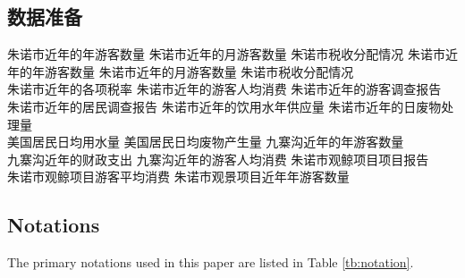 \documentclass[12pt]{article}  %
\begin{document}
\subsection{数据准备}
\begin{tabbing}
    朱诺市近年的年游客数量 \= 朱诺市近年的月游客数量 \= 朱诺市税收分配情况 \kill
    朱诺市近年的年游客数量 \> 朱诺市近年的月游客数量 \> 朱诺市税收分配情况 \\
    朱诺市近年的各项税率 \> 朱诺市近年的游客人均消费 \> 朱诺市近年的游客调查报告 \\
    朱诺市近年的居民调查报告 \> 朱诺市近年的饮用水年供应量 \> 朱诺市近年的日废物处理量 \\
    美国居民日均用水量 \> 美国居民日均废物产生量 \> 九寨沟近年的年游客数量 \\
    九寨沟近年的财政支出 \> 九寨沟近年的游客人均消费 \> 朱诺市观鲸项目项目报告 \\
    朱诺市观鲸项目游客平均消费 \> 朱诺市观景项目近年年游客数量
\end{tabbing}
\subsection{Notations}
The primary notations used in this paper are listed in Table \ref{tb:notation}.
\end{document}
